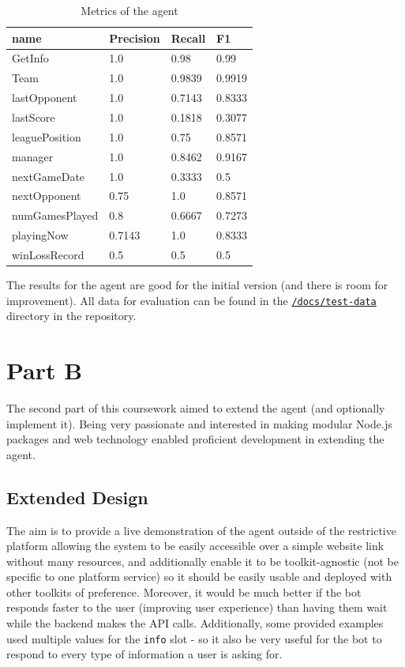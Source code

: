 \documentclass[10pt,a4paper,twocolumn]{article}
\newcommand{\cmmnt}[1]{}
\begin{document}
\begin{table}[h]
\centering
\begin{tabular}{llll}
\hline
name           & Precision & Recall & F1     \\ \hline
GetInfo        & 1.0       & 0.98   & 0.99   \\
Team           & 1.0       & 0.9839 & 0.9919 \\
lastOpponent   & 1.0       & 0.7143 & 0.8333 \\
lastScore      & 1.0       & 0.1818 & 0.3077 \\
leaguePosition & 1.0       & 0.75   & 0.8571 \\
manager        & 1.0       & 0.8462 & 0.9167 \\
nextGameDate   & 1.0       & 0.3333 & 0.5    \\
nextOpponent   & 0.75      & 1.0    & 0.8571 \\
numGamesPlayed & 0.8       & 0.6667 & 0.7273 \\
playingNow     & 0.7143    & 1.0    & 0.8333 \\
winLossRecord  & 0.5       & 0.5    & 0.5    \\ \hline
\end{tabular}
\caption*{Metrics of the agent}
\end{table}

The results for the agent are good for the initial version (and there is room for improvement). All data for evaluation can be found in the \href{https://github.com/ineshbose/UofG_Conversational_Interfaces/blob/master/docs/test-data}{\texttt{/docs/test-data}} directory in the repository.

\section{Part B}

The second part of this coursework aimed to extend the agent (and optionally implement it). Being very passionate and interested in making modular Node.js packages and web technology enabled proficient development in extending the agent.

\subsection{Extended Design \cmmnt{\small (5 marks)}}

The aim is to provide a live demonstration of the agent outside of the restrictive platform allowing the system to be easily accessible over a simple website link without many resources, and additionally enable it to be toolkit-agnostic (not be specific to one platform service) so it should be easily usable and deployed with other toolkits of preference. Moreover, it would be much better if the bot responds faster to the user (improving user experience) than having them wait while the backend makes the API calls. Additionally, some provided examples used multiple values for the \texttt{info} slot - so it also be very useful for the bot to respond to every type of information a user is asking for.
\end{document}
